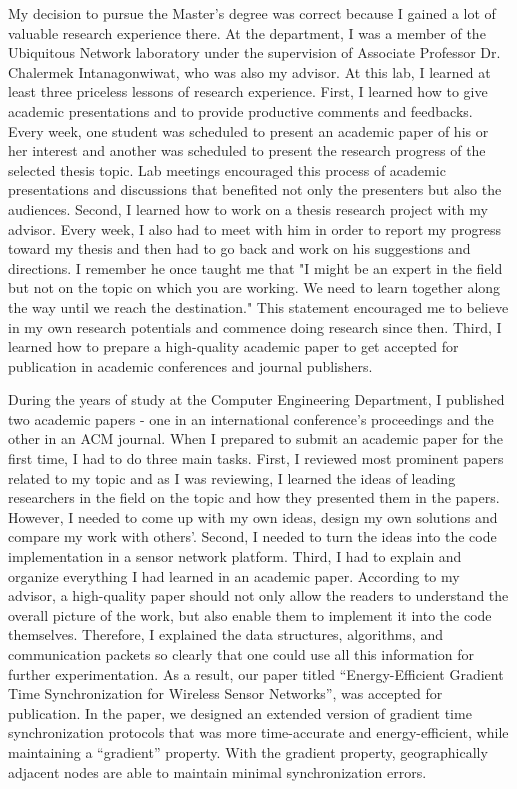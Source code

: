 \documentclass[a4paper,10pt]{report}
\begin{document}
\vspace{0.2cm}
My decision to pursue the Master's degree was correct because I gained a lot of valuable research experience there. At the department, I was a member of the Ubiquitous Network laboratory under the supervision of Associate Professor Dr. Chalermek Intanagonwiwat, who was also my advisor. At this lab, I learned at least three priceless lessons of research experience. First, I learned how to give academic presentations and to provide productive comments and feedbacks. Every week, one student was scheduled to present an academic paper of his or her interest and another was scheduled to present the research progress of the selected thesis topic. Lab meetings encouraged this process of academic presentations and discussions that benefited not only the presenters but also the audiences. Second, I learned how to work on a thesis research project with my advisor. Every week, I also had to meet with him in order to report my progress toward my thesis and then had to go back and work on his suggestions and directions. I remember he once taught me that "I might be an expert in the field but not on the topic on which you are working. We need to learn together along the way until we reach the destination." This statement encouraged me to believe in my own research potentials and commence doing research since then. Third, I learned how to prepare a high-quality academic paper to get accepted for publication in academic conferences and journal publishers.

\vspace{0.2cm}
During the years of study at the Computer Engineering Department, I published two academic papers - one in an international conference's proceedings and the other in an ACM journal. When I prepared to submit an academic paper for the first time, I had to do three main tasks. First, I reviewed most prominent papers related to my topic and as I was reviewing, I learned the ideas of leading researchers in the field on the topic and how they presented them in the papers. However, I needed to come up with my own ideas, design my own solutions and compare my work with others'. Second, I needed to turn the ideas into the code implementation in a sensor network platform. Third, I had to explain and organize everything I had learned in an academic paper. According to my advisor, a high-quality paper should not only allow the readers to understand the overall picture of the work, but also enable them to implement it into the code themselves. Therefore, I explained the data structures, algorithms, and communication packets so clearly that one could use all this information for further experimentation. As a result, our paper titled ``Energy-Efficient Gradient Time Synchronization for Wireless Sensor Networks'', was accepted for publication. In the paper, we designed an extended version of gradient time synchronization protocols that was more time-accurate and energy-efficient, while maintaining a ``gradient'' property. With the gradient property, geographically adjacent nodes are able to maintain minimal synchronization errors.
\end{document}

